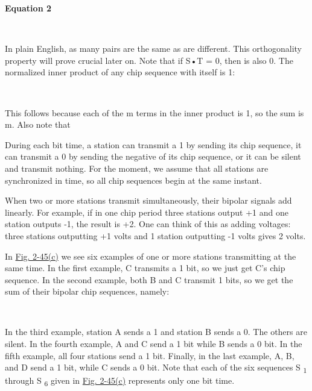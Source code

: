\textbf{\protect\hypertarget{0130661023_ch02lev1sec6.htmlux5cux23ch02eq04}{}{}
Equation 2}


~

In plain English, as many pairs are the same as are different. This
orthogonality property will prove crucial later on. Note that if {S}•{T}
= 0, then
is also 0. The normalized inner
product of any chip sequence with itself is 1:


~

This follows because each of the {m} terms in the inner product is 1, so
the sum is {m}. Also note that

During each bit time, a station can transmit a 1 by sending its chip
sequence, it can transmit a 0 by sending the negative of its chip
sequence, or it can be silent and transmit nothing. For the moment, we
assume that all stations are synchronized in time, so all chip sequences
begin at the same instant.

When two or more stations transmit simultaneously, their bipolar signals
add linearly. For example, if in one chip period three stations output
+1 and one station outputs -1, the result is +2. One can think of this
as adding voltages: three stations outputting +1 volts and 1 station
outputting -1 volts gives 2 volts.

In
\protect\hyperlink{0130661023_ch02lev1sec6.htmlux5cux23ch02fig45}{Fig.
2-45(c)} we see six examples of one or more stations transmitting at the
same time. In the first example, {C} transmits a 1 bit, so we just get
{C}'s chip sequence. In the second example, both {B} and {C} transmit 1
bits, so we get the sum of their bipolar chip sequences, namely:


~

In the third example, station {A} sends a 1 and station {B} sends a 0.
The others are silent. In the fourth example, {A} and {C} send a 1 bit
while {B} sends a 0 bit. In the fifth example, all four stations send a
1 bit. Finally, in the last example, {A}, {B}, and {D} send a 1 bit,
while {C} sends a 0 bit. Note that each of the six sequences {S}
\textsubscript{1} through {S} \textsubscript{6} given in
\protect\hyperlink{0130661023_ch02lev1sec6.htmlux5cux23ch02fig45}{Fig.
2-45(c)} represents only one bit time.

